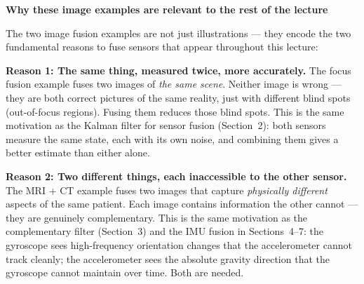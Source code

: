 \documentclass[12pt, a4paper]{article}
\begin{document}
\begin{notebox}
  \textbf{Why these image examples are relevant to the rest of the lecture}

  The two image fusion examples are not just illustrations --- they encode
  the two fundamental reasons to fuse sensors that appear throughout this
  lecture:

  \textbf{Reason 1: The same thing, measured twice, more accurately.}
  The focus fusion example fuses two images of \emph{the same scene}.
  Neither image is wrong --- they are both correct pictures of the same
  reality, just with different blind spots (out-of-focus regions).
  Fusing them reduces those blind spots.
  This is the same motivation as the Kalman filter for sensor fusion
  (Section~2): both sensors measure the same state, each with its own noise,
  and combining them gives a better estimate than either alone.

  \textbf{Reason 2: Two different things, each inaccessible to the other
  sensor.}
  The MRI + CT example fuses two images that capture \emph{physically
  different} aspects of the same patient.
  Each image contains information the other cannot --- they are genuinely
  complementary.
  This is the same motivation as the complementary filter (Section~3) and
  the IMU fusion in Sections~4--7: the gyroscope sees high-frequency
  orientation changes that the accelerometer cannot track cleanly; the
  accelerometer sees the absolute gravity direction that the gyroscope
  cannot maintain over time.
  Both are needed.
\end{notebox}
\end{document}
